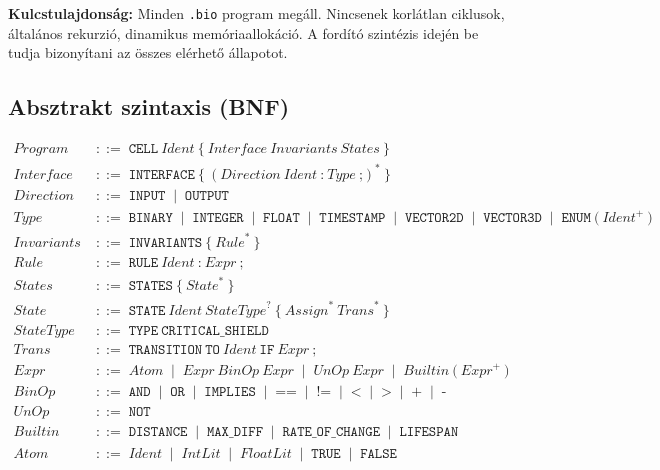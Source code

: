 \documentclass[11pt,a4paper,twoside]{article}
\newcommand{\nt}[1]{\textit{#1}}
\newcommand{\tm}[1]{\texttt{#1}}
\newcommand{\bnfor}{\;\mid\;}
\newcommand{\bnfdef}{\;{::=}\;}
\begin{document}
\begin{mdframed}[style=notebox]
\textbf{Kulcstulajdonság:} Minden \texttt{.bio} program megáll.
Nincsenek korlátlan ciklusok, általános rekurzió, dinamikus memóriaallokáció.
A fordító szintézis idején be tudja bizonyítani az összes elérhető állapotot.
\end{mdframed}

\subsection{Absztrakt szintaxis (BNF)}

\vspace{4pt}
\begin{align*}
\nt{Program}   &\bnfdef \tm{CELL}\ \nt{Ident}\ \tm{\{}\ \nt{Interface}\ \nt{Invariants}\ \nt{States}\ \tm{\}} \\[3pt]
\nt{Interface}  &\bnfdef \tm{INTERFACE}\ \tm{\{}\ (\nt{Direction}\ \nt{Ident}\ \tm{:}\ \nt{Type}\ \tm{;})^*\ \tm{\}} \\
\nt{Direction}  &\bnfdef \tm{INPUT} \bnfor \tm{OUTPUT} \\
\nt{Type}       &\bnfdef \tm{BINARY} \bnfor \tm{INTEGER} \bnfor \tm{FLOAT}
                          \bnfor \tm{TIMESTAMP} \bnfor \tm{VECTOR2D}
                          \bnfor \tm{VECTOR3D} \bnfor \tm{ENUM}\ \tm{(}\ \nt{Ident}^+\ \tm{)} \\[3pt]
\nt{Invariants} &\bnfdef \tm{INVARIANTS}\ \tm{\{}\ \nt{Rule}^*\ \tm{\}} \\
\nt{Rule}       &\bnfdef \tm{RULE}\ \nt{Ident}\ \tm{:}\ \nt{Expr}\ \tm{;} \\[3pt]
\nt{States}     &\bnfdef \tm{STATES}\ \tm{\{}\ \nt{State}^*\ \tm{\}} \\
\nt{State}      &\bnfdef \tm{STATE}\ \nt{Ident}\ \nt{StateType}^?\ \tm{\{}\ \nt{Assign}^*\ \nt{Trans}^*\ \tm{\}} \\
\nt{StateType}  &\bnfdef \tm{TYPE}\ \tm{CRITICAL\_SHIELD} \\
\nt{Trans}      &\bnfdef \tm{TRANSITION}\ \tm{TO}\ \nt{Ident}\ \tm{IF}\ \nt{Expr}\ \tm{;} \\[3pt]
\nt{Expr}       &\bnfdef \nt{Atom} \bnfor \nt{Expr}\ \nt{BinOp}\ \nt{Expr}
                          \bnfor \nt{UnOp}\ \nt{Expr}
                          \bnfor \nt{Builtin}\ \tm{(}\ \nt{Expr}^+\ \tm{)} \\
\nt{BinOp}      &\bnfdef \tm{AND} \bnfor \tm{OR} \bnfor \tm{IMPLIES}
                          \bnfor \tm{==} \bnfor \tm{!=} \bnfor \tm{<}
                          \bnfor \tm{>} \bnfor \tm{+} \bnfor \tm{-} \\
\nt{UnOp}       &\bnfdef \tm{NOT} \\
\nt{Builtin}    &\bnfdef \tm{DISTANCE} \bnfor \tm{MAX\_DIFF}
                          \bnfor \tm{RATE\_OF\_CHANGE} \bnfor \tm{LIFESPAN} \\
\nt{Atom}       &\bnfdef \nt{Ident} \bnfor \nt{IntLit} \bnfor \nt{FloatLit}
                          \bnfor \tm{TRUE} \bnfor \tm{FALSE}
\end{align*}
\end{document}
